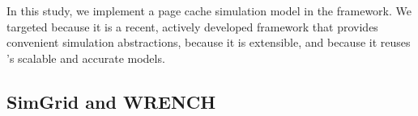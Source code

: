 In this study, we implement a page cache simulation model in the
\wrench framework. We targeted \wrench because it is a recent,
actively developed framework that provides convenient simulation
abstractions, because it is extensible, and because it reuses
\simgrid's scalable and accurate models.

\subsection{SimGrid and WRENCH}
